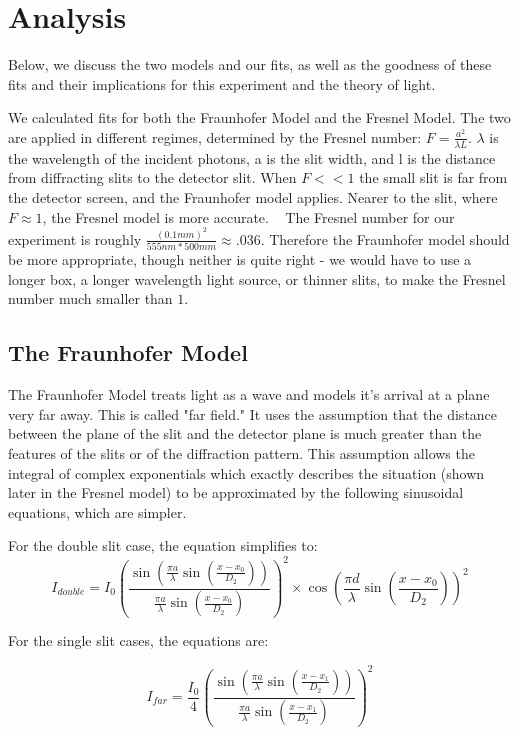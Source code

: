 \documentclass[prb,preprint]{revtex4-1}
\begin{document}
\section{Analysis}

Below, we discuss the two models and our fits, as well as the goodness of these fits and their implications for this experiment and the theory of light.

We calculated fits for both the Fraunhofer Model and the Fresnel Model.  The two are applied in different regimes, determined by the Fresnel number: $F = \frac{a^2}{\lambda L}$.  $\lambda$ is the wavelength of the incident photons, a is the slit width, and l is the distance from diffracting slits to the detector slit.  When $F << 1$ the small slit is far from the detector screen, and the Fraunhofer model applies.  Nearer to the slit, where $F \approx 1$, the Fresnel model is more accurate. ~\cite{wolfram} The Fresnel number for our experiment is roughly $\frac{(0.1mm)^2}{555nm*500mm} \approx .036$.  Therefore the Fraunhofer model should be more appropriate, though neither is quite right - we would have to use a longer box, a longer wavelength light source, or thinner slits, to make the Fresnel number much smaller than $1$. 

\subsection{The Fraunhofer Model}

The Fraunhofer Model treats light as a wave and models it's arrival at a plane very far away. This is called "far field." It uses the assumption that the distance between the plane of the slit and the detector plane is much greater than the features of the slits or of the diffraction pattern.  This assumption allows the integral of complex exponentials which exactly describes the situation (shown later in the Fresnel model) to be approximated by the following sinusoidal equations, which are simpler. ~\cite{wolfram}

For the double slit case, the equation simplifies to:
\begin{equation}
I_{double}= I_{0}(\frac{\sin(\frac{\pi a}{\lambda}\sin(\frac{x-x_{0}}{D_{2}}))}{\frac{\pi a}{\lambda}\sin(\frac{x-x_{0}}{D_{2}})})^{2} \times \cos(\frac{\pi d}{\lambda}\sin(\frac{x-x_{0}}{D_{2}}))^{2}
\end{equation}

For the single slit cases, the equations are: 

\begin{equation}
I_{far}= \frac{I_{0}}{4}(\frac{\sin(\frac{\pi a}{\lambda}\sin(\frac{x-x_{1}}{D_{2}}))}{\frac{\pi a}{\lambda}\sin(\frac{x-x_{1}}{D_{2}})})^{2} 
\end{equation}
\end{document}
